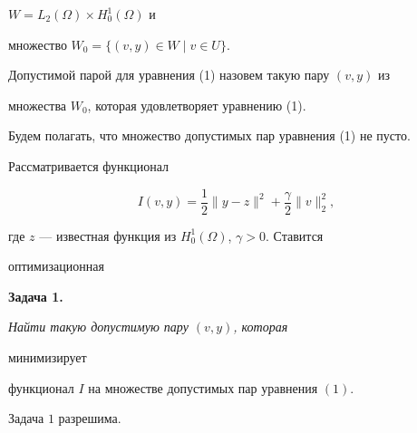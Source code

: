 $W=L_2(\Omega)\times H^1_0(\Omega)$ и 


множество $W_0=\{(v,y)\in W\mid v\in U\}$. 


 


\begin{defn} 


Допустимой парой для уравнения (1) назовем такую пару $(v,y)$ из 


множества $W_0$, которая удовлетворяет уравнению (1). 


\end{defn} 


 


Будем полагать, что множество допустимых пар уравнения (1) не пусто. 


Рассматривается функционал 


$$ 


I(v,y)=\frac{1}{2}\|y-z\|^2+\frac{\gamma}{2}\|v\|^2_2, 


$$ 


где $z$ --- известная функция из $H^1_0(\Omega)$, $\gamma>0$. Ставится 


оптимизационная 


\medskip 


 


 


{\bf Задача 1.} {\it Найти такую допустимую пару $(v,y)$, которая 


минимизирует 


функционал $I$ на множестве допустимых пар уравнения $(1)$.} 


 


 


\begin{thm} 


Задача $1$ разрешима. 


\end{thm} 


 



